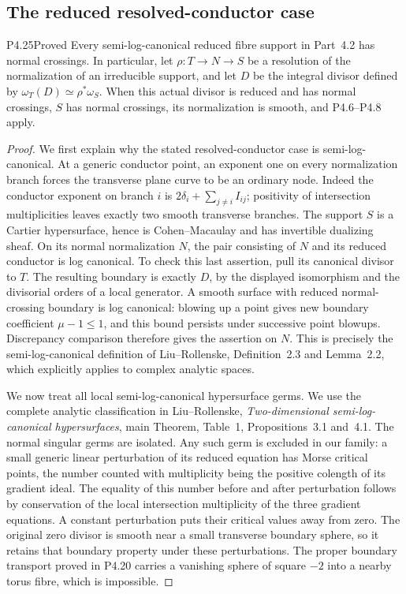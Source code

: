 \subsection{The reduced resolved-conductor case}

\begin{statement}{P4.25}{Proved}
Every semi-log-canonical reduced fibre support in
Part~4.2 has normal crossings. In particular, let
$\rho:T\to N\to S$ be a resolution of the normalization
of an irreducible support, and let $D$ be the integral
divisor defined by
$\omega_T(D)\simeq\rho^*\omega_S$. When this actual
divisor is reduced and has normal crossings, $S$
has normal crossings, its normalization is smooth,
and P4.6--P4.8 apply.
\end{statement}
\begin{proof}
We first explain why the stated resolved-conductor
case is semi-log-canonical. At a generic conductor
point, an exponent one on every normalization
branch forces the transverse plane curve to be an
ordinary node. Indeed the conductor exponent on
branch $i$ is
$2\delta_i+\sum_{j\ne i}I_{ij}$; positivity of
intersection multiplicities leaves exactly two
smooth transverse branches. The support $S$ is a
Cartier hypersurface, hence is Cohen--Macaulay and
has invertible dualizing sheaf. On its normal
normalization $N$, the pair consisting of $N$
and its reduced conductor is log canonical.
To check this last assertion, pull its canonical
divisor to $T$. The resulting boundary is exactly
$D$, by the displayed isomorphism and the
divisorial orders of a local generator. A smooth
surface with reduced normal-crossing boundary is
log canonical: blowing up a point gives new
boundary coefficient $\mu-1\le1$, and this
bound persists under successive point blowups.
Discrepancy comparison therefore gives the
assertion on $N$. This is precisely the
semi-log-canonical definition of
Liu--Rollenske, Definition~2.3 and Lemma~2.2,
which explicitly applies to complex analytic
spaces.

We now treat all local semi-log-canonical
hypersurface germs. We use the complete analytic
classification in Liu--Rollenske,
\emph{Two-dimensional semi-log-canonical
hypersurfaces}, main Theorem, Table~1,
Propositions~3.1 and~4.1. The normal singular
germs are isolated. Any such germ is excluded
in our family: a small generic linear
perturbation of its reduced equation has
Morse critical points, the number counted
with multiplicity being the positive
colength of its gradient ideal. The equality
of this number before and after perturbation
follows by conservation of the local
intersection multiplicity of the three
gradient equations. A constant perturbation
puts their critical values away from zero.
The original zero divisor is smooth near
a small transverse boundary sphere, so it
retains that boundary property under these
perturbations. The proper boundary
transport proved in P4.20 carries a
vanishing sphere of square $-2$ into a
nearby torus fibre, which is impossible.


\end{proof}
